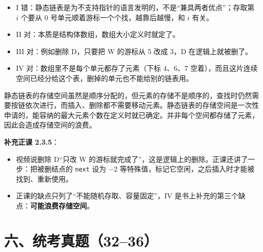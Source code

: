 \documentclass[10.5pt,a4paper,oneside]{article}
\providecommand{\tightlist}{\setlength{\itemsep}{2pt}\setlength{\parskip}{0pt}}
\newcommand{\tocback}{\par\vspace{-3pt}{\hfill\footnotesize\hyperlink{toc}{\textcolor{wdgray}{\ensuremath{\uparrow}\,回到目录}}}\par\vspace{-4pt}}
\begin{document}
\begin{videobox}

\begin{itemize}
\tightlist
\item
  I 错：静态链表是为不支持指针的语言发明的，不是“兼具两者优点”；存取第
  \(i\) 个要从 0 号单元顺着游标一个个找，越靠后越慢，和 \(i\) 有关。
\item
  II 对：本质是结构体数组，数组大小定义时就定了。
\item
  III 对：例如删除 D，只要把 W 的游标从 5 改成 3，D 在逻辑上就被删了。
\item
  IV 对：数组里不是每个单元都存了元素（下标 4、6、7
  空着），而且这片连续空间已经分给这个表，删掉的单元也不能给别的链表用。
\end{itemize}

\end{videobox}

\begin{jiexibox}

静态链表的存储空间虽然是顺序分配的，但元素的存储不是顺序的，查找时仍然需要按链依次进行，而插入、删除都不需要移动元素。静态链表的存储空间是一次性申请的，能容纳的最大元素个数在定义时就已确定。并非每个空间都存储了元素，因此会造成存储空间的浪费。

\end{jiexibox}

\begin{addbox}

\textbf{补充正课 2.3.5}：

\begin{itemize}
\tightlist
\item
  视频说删除 D“只改 W
  的游标就完成了”，这是逻辑上的删除。正课还讲了一步：把被删结点的
  \texttt{next} 设为 \(-2\)
  等特殊值，标记它空闲，之后插入时才能被找到、重新使用。
\item
  正课的缺点只列了“不能随机存取、容量固定”，IV
  是书上补充的第三个缺点：\textbf{可能浪费存储空间}。
\end{itemize}

\end{addbox}

\hypertarget{ux516dux7edfux8003ux771fux98983236}{%
\section{六、统考真题（32--36）}\label{ux516dux7edfux8003ux771fux98983236}}

\tocback

\vspace{22pt}
\end{document}
